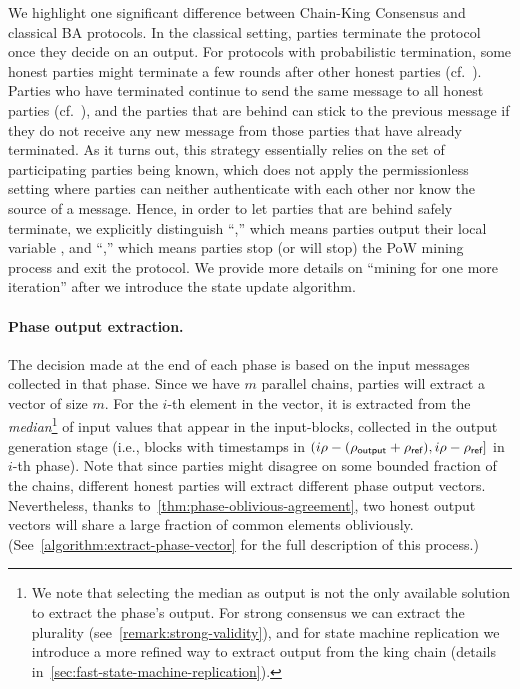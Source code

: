 We highlight one significant difference between Chain-King Consensus and classical BA protocols.
%
In the classical setting, parties terminate the protocol once they decide on an output.
%
For protocols with probabilistic termination, some honest parties might terminate a few rounds after other honest parties (cf.~\cite{JACM:DolReiStr90}).
%
Parties who have terminated continue to send the same message to all honest parties (cf.~\cite{STOC:FelMic88,C:KatKoo06}), and the parties that are behind can stick to the previous message if they do not receive any new message from those parties that have already terminated.
%
As it turns out, this strategy essentially relies on the set of participating parties being known, which does not apply the permissionless setting where parties can neither authenticate with each other nor know the source of a message.
%
Hence, in order to let parties that are behind safely terminate, we explicitly distinguish ``\decide,'' which means parties output their local variable \val, and ``\exit,'' which means parties stop (or will stop) the PoW mining process and exit the protocol.
%
We provide more details on ``mining for one more iteration'' after we introduce the state update algorithm.

\paragraph{Phase output extraction.}
%
The decision made at the end of each phase is based on the input messages collected in that phase.
%
Since we have $m$ parallel chains, parties will extract a vector of size $m$.
%
For the $i$-th element in the vector, it is extracted from the \emph{median}\footnote{We note that selecting the median as output is not the only available solution to extract the phase's output. For strong consensus we can extract the plurality (see~\cref{remark:strong-validity}), and for state machine replication we introduce a more refined way to extract output from the king chain (details in~\cref{sec:fast-state-machine-replication}).} of input values that appear in the input-blocks, collected in the output generation stage (i.e., blocks with timestamps in $(i \rho - (\rho_{\textsf{output}} + \rho_{\textsf{ref}}), i \rho  - \rho_{\textsf{ref}}]$ in $i$-th phase).
%
Note that since parties might disagree on some bounded fraction of the chains, different honest parties will extract different phase output vectors.
%
Nevertheless, thanks to~\cref{thm:phase-oblivious-agreement}, two honest output vectors will share a large fraction of common elements obliviously.
%
(See~\cref{algorithm:extract-phase-vector} for the full description of this process.)

